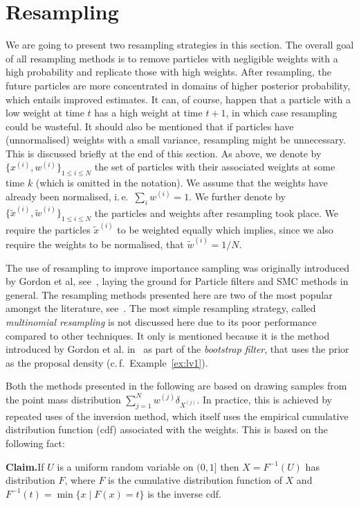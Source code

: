 \section*{Resampling}
We are going to present two resampling strategies in this section. The
overall goal of all resampling methods is to remove particles with
negligible weights with a high probability and replicate those with
high weights. After resampling, the future particles are more
concentrated in domains of higher posterior probability, which entails
improved estimates. It can, of course, happen that a particle with a
low weight at time $t$ has a high weight at time $t+1$, in which case
resampling could be wasteful. It should also be mentioned that if
particles have (unnormalised) weights with a small variance,
resampling might be unnecessary. This is discussed briefly at the end
of this section. As above, we denote by
$\{ x^{(i)}, w^{(i)} \}_{1 \le i \le N}$ the set of particles with
their associated weights at some time $k$ (which is omitted in the
notation). We assume that the weights have already been normalised,
i.\,e.\ $\sum_i w^{(i)} = 1$. We further denote by
$\{ \tilde{x}^{(i)}, \tilde{w}^{(i)} \}_{1 \le i \le N}$ the particles
and weights after resampling took place. We require the particles
$\tilde{x}^{(i)}$ to be weighted equally which implies, since we also
require the weights to be normalised, that $\tilde{w}^{(i)} = 1/N$.

The use of resampling to improve importance sampling was originally
introduced by Gordon et al, see~\cite{gordon}, laying the ground for
Particle filters and SMC methods in general. The resampling methods
presented here are two of the most popular amongst the literature,
see~\cite{douc}.  The most simple resampling strategy, called
\emph{multinomial resampling} is not discussed here due to its poor
performance compared to other techniques. It only is mentioned because
it is the method introduced by Gordon et al. in~\cite{gordon} as part
of the\emph{ bootstrap filter}, that uses the prior as the proposal
density (c.\,f.\ Example~\ref{ex:lv1}).

Both the methods presented in the following are based on drawing
samples from the point mass distribution
$\sum_{j=1}^N w^{(j)} \delta_{X^{(j)}}$. In practice, this is achieved
by repeated uses of the inversion method, which itself uses the
empirical cumulative distribution function (cdf) associated with the
weights. This is based on the following fact:

\textbf{Claim.}\quad If $U$ is a uniform random variable on $(0,1]$
then $X = F^{-1}(U)$ has distribution $F$, where $F$ is the cumulative
distribution function of $X$ and
$F^{-1}(t) = \min \{ x \mid F(x) = t \}$ is the inverse cdf.

